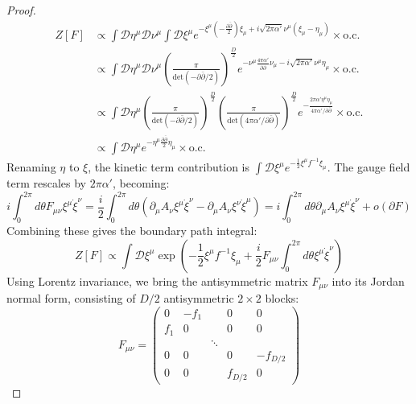 \begin{tcolorbox}[breakable]
\begin{proof}
\begin{align*}
				Z[F] &\propto \int \mathcal{D}\eta^\mu \mathcal{D}\nu^\mu \int \mathcal{D}\xi^\mu e^{-\xi^\mu \left( -\frac{\partial\bar{\partial}}{2} \right) \xi_\mu + i \sqrt{2\pi\alpha'} \nu^\mu (\xi_\mu - \eta_\mu)} \times \text{o.c.} \\
				&\propto \int \mathcal{D}\eta^\mu \mathcal{D}\nu^\mu \left( \frac{\pi}{\text{det}(-\partial\bar{\partial}/2)} \right)^{\frac{D}{2}} e^{-\nu^\mu \frac{4\pi\alpha'}{\partial\bar{\partial}} \nu_\mu - i \sqrt{2\pi\alpha'} \nu^\mu \eta_\mu} \times \text{o.c.} \\
				&\propto \int \mathcal{D}\eta^\mu \left( \frac{\pi}{\text{det}(-\partial\bar{\partial}/2)} \right)^{\frac{D}{2}} \left( \frac{\pi}{\text{det}(4\pi\alpha'/\partial\bar{\partial})} \right)^{\frac{D}{2}} e^{-\frac{2\pi\alpha'\eta^\mu\eta_\mu}{4\pi\alpha'/\partial\bar{\partial}}} \times \text{o.c.} \\
				&\propto \int \mathcal{D}\eta^\mu e^{-\eta^\mu \frac{\partial\bar{\partial}}{2} \eta_\mu} \times \text{o.c.}
			\end{align*}
			Renaming $\eta$ to $\xi$, the kinetic term contribution is $\int \mathcal{D}\xi^\mu e^{-\frac{1}{2} \xi^\mu f^{-1} \xi_\mu}$. The gauge field term rescales by $2\pi\alpha'$, becoming:
			\begin{equation}
				i \int_0^{2\pi} d\theta F_{\mu\nu} \xi^\mu \dot{\xi}^\nu = \frac{i}{2} \int_0^{2\pi} d\theta ( \partial_\mu A_\nu \xi^\mu \dot{\xi}^\nu - \partial_\mu A_\nu \xi^\nu \dot{\xi}^\mu ) = i \int_0^{2\pi} d\theta \partial_\mu A_\nu \xi^\mu \dot{\xi}^\nu + o(\partial F) 
			\end{equation}
			Combining these gives the boundary path integral:
			\begin{equation}
				Z[F] \propto \int \mathcal{D}\xi^\mu \exp \left( -\frac{1}{2} \xi^\mu f^{-1} \xi_\mu + \frac{i}{2} F_{\mu\nu} \int_0^{2\pi} d\theta \xi^\mu \dot{\xi}^\nu \right) 
			\end{equation}
			Using Lorentz invariance, we bring the antisymmetric matrix $F_{\mu\nu}$ into its Jordan normal form, consisting of $D/2$ antisymmetric $2 \times 2$ blocks:
			\begin{equation}
				F_{\mu\nu} = \begin{pmatrix} 
					0 & -f_1 & & 0 & 0 \\
					f_1 & 0 & & 0 & 0 \\
					& & \ddots & & \\
					0 & 0 & & 0 & -f_{D/2} \\
					0 & 0 & & f_{D/2} & 0 
				\end{pmatrix}
			\end{equation}
			

\end{proof}
\end{tcolorbox}
